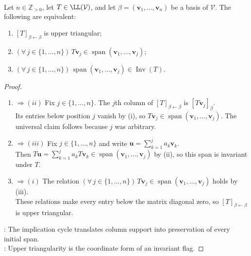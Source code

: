 \begin{theorem} \label{thm:upper-triangular-criteria} \\
Let $n\in\mathbb{Z}_{>0}$, let $T\in\LL(\mathcal{V})$, and let $\beta=(\mathbf{v}_1,\ldots,\mathbf{v}_n)$ be a basis of $\mathcal{V}$. The following are equivalent:
\begin{enumerate}[label=(\roman*)]
\setlength{\itemsep}{0pt}
\item $[T]_{\beta\leftarrow\beta}$ is upper triangular;
\item $(\forall\,j\in\{1,\ldots,n\})\,T\mathbf{v}_j\in\operatorname{span}(\mathbf{v}_1,\ldots,\mathbf{v}_j)$;
\item $(\forall\,j\in\{1,\ldots,n\})\,\operatorname{span}(\mathbf{v}_1,\ldots,\mathbf{v}_j)\in\operatorname{Inv}(T)$.
\end{enumerate}
\begin{proof}
\begin{enumerate}[label=(\roman*)]
\setlength{\itemsep}{0pt}
\item[$(i)$] $\Rightarrow (ii)$ Fix $j\in\{1,\ldots,n\}$. The $j$th column of $[T]_{\beta\leftarrow\beta}$ is $[T\mathbf{v}_j]_{\beta}$.\\
Its entries below position $j$ vanish by (i), so $T\mathbf{v}_j\in\operatorname{span}(\mathbf{v}_1,\ldots,\mathbf{v}_j)$. The universal claim follows because $j$ was arbitrary.
\item[$(ii)$] $\Rightarrow (iii)$ Fix $j\in\{1,\ldots,n\}$ and write $\mathbf{u}=\sum\limits_{k=1}^{j}a_k\mathbf{v}_k$.\\
Then $T\mathbf{u}=\sum\limits_{k=1}^{j}a_kT\mathbf{v}_k\in\operatorname{span}(\mathbf{v}_1,\ldots,\mathbf{v}_j)$ by (ii), so this span is invariant under $T$.
\item[$(iii)$] $\Rightarrow (i)$ The relation $(\forall\,j\in\{1,\ldots,n\})\,T\mathbf{v}_j\in\operatorname{span}(\mathbf{v}_1,\ldots,\mathbf{v}_j)$ holds by (iii).\\
These relations make every entry below the matrix diagonal zero, so $[T]_{\beta\leftarrow\beta}$ is upper triangular.
\end{enumerate}
: The implication cycle translates column support into preservation of every initial span.\\
: Upper triangularity is the coordinate form of an invariant flag.
\end{proof}
\end{theorem}

